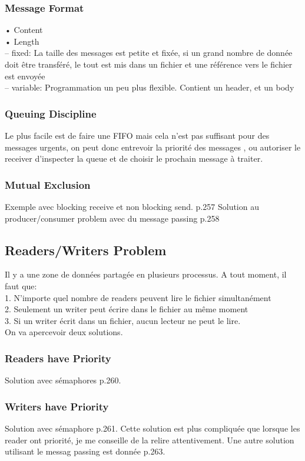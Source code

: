 \subsubsection{Message Format}
\noindent • Content \\
• Length \\
– fixed: La taille des messages est petite et fixée, si un grand nombre de donnée doit être transféré, le tout est mis dans un fichier et une référence vers le fichier est envoyée \\
– variable: Programmation un peu plus flexible. Contient un header, et un body \\
\subsubsection{Queuing Discipline}
Le plus facile est de faire une FIFO mais cela n’est pas suffisant pour des messages urgents, on peut donc entrevoir la priorité des messages , ou autoriser le receiver d’inspecter la queue et de choisir le prochain message à traiter.
\subsubsection{Mutual Exclusion}
Exemple avec blocking receive et non blocking send. p.257
Solution au producer/consumer problem avec du message passing p.258
\subsection{Readers/Writers Problem}
Il y a une zone de données partagée en plusieurs processus. A tout moment, il faut que: \\
1. N’importe quel nombre de readers peuvent lire le fichier simultanément \\
2. Seulement un writer peut écrire dans le fichier au même moment \\
3. Si un writer écrit dans un fichier, aucun lecteur ne peut le lire. \\
On va apercevoir deux solutions.
\subsubsection{Readers have Priority}
Solution avec sémaphores p.260.
\subsubsection{Writers have Priority}
Solution avec sémaphore p.261. Cette solution est plus compliquée que lorsque les reader ont priorité, je me conseille de la relire attentivement. Une autre solution utilisant le messag passing est donnée p.263.
\newpage

